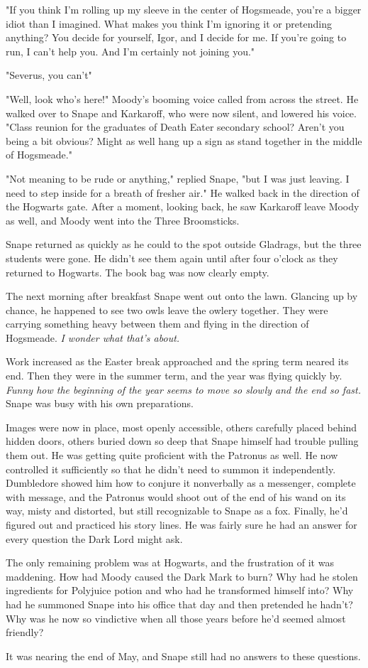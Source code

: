 "If you think I'm rolling up my sleeve in the center of Hogsmeade, you're a bigger idiot than I imagined. What makes you think I'm ignoring it or pretending anything? You decide for yourself, Igor, and I decide for me. If you're going to run, I can't help you. And I'm certainly not joining you."

"Severus, you can't{\el}"

"Well, look who's here!" Moody's booming voice called from across the street. He walked over to Snape and Karkaroff, who were now silent, and lowered his voice. "Class reunion for the graduates of Death Eater secondary school? Aren't you being a bit obvious? Might as well hang up a sign as stand together in the middle of Hogsmeade."

"Not meaning to be rude or anything," replied Snape, "but I was just leaving. I need to step inside for a breath of fresher air." He walked back in the direction of the Hogwarts gate. After a moment, looking back, he saw Karkaroff leave Moody as well, and Moody went into the Three Broomsticks.

Snape returned as quickly as he could to the spot outside Gladrags, but the three students were gone. He didn't see them again until after four o'clock as they returned to Hogwarts. The book bag was now clearly empty.

The next morning after breakfast Snape went out onto the lawn. Glancing up by chance, he happened to see two owls leave the owlery together. They were carrying something heavy between them and flying in the direction of Hogsmeade. \emph{I wonder what that's about.}

Work increased as the Easter break approached and the spring term neared its end. Then they were in the summer term, and the year was flying quickly by. \emph{Funny how the beginning of the year seems to move so slowly and the end so fast.} Snape was busy with his own preparations.

Images were now in place, most openly accessible, others carefully placed behind hidden doors, others buried down so deep that Snape himself had trouble pulling them out. He was getting quite proficient with the Patronus as well. He now controlled it sufficiently so that he didn't need to summon it independently. Dumbledore showed him how to conjure it nonverbally as a messenger, complete with message, and the Patronus would shoot out of the end of his wand on its way, misty and distorted, but still recognizable to Snape as a fox. Finally, he'd figured out and practiced his story lines. He was fairly sure he had an answer for every question the Dark Lord might ask.

The only remaining problem was at Hogwarts, and the frustration of it was maddening. How had Moody caused the Dark Mark to burn? Why had he stolen ingredients for Polyjuice potion and who had he transformed himself into? Why had he summoned Snape into his office that day and then pretended he hadn't? Why was he now so vindictive when all those years before he'd seemed almost{\el} friendly?

It was nearing the end of May, and Snape still had no answers to these questions. 


